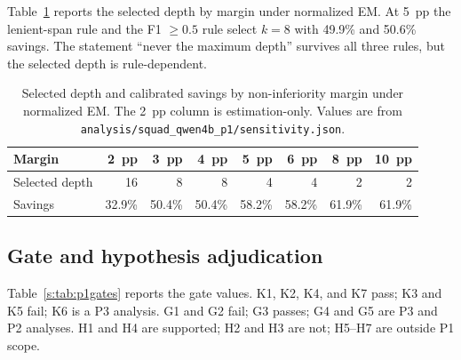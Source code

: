 Table~\ref{tab:p1margin} reports the selected depth by margin under normalized EM. At 5~pp the
lenient-span rule and the F1 $\ge0.5$ rule select $k=8$ with 49.9\% and 50.6\% savings. The
statement ``never the maximum depth'' survives all three rules, but the selected depth is
rule-dependent.

\begin{table}[pos=htbp]
  \centering
  \caption{Selected depth and calibrated savings by non-inferiority margin under normalized EM.
  The 2~pp column is estimation-only. Values are from
  \texttt{analysis/squad\_qwen4b\_p1/sensitivity.json}.}
  \label{tab:p1margin}
  \small
  \setlength{\tabcolsep}{5pt}
  \begin{tabular}{lrrrrrrr}
    \toprule
    \textbf{Margin} & \textbf{2~pp} & \textbf{3~pp} & \textbf{4~pp} & \textbf{5~pp} & \textbf{6~pp} & \textbf{8~pp} & \textbf{10~pp} \\
    \midrule
    Selected depth & 16 & 8 & 8 & 4 & 4 & 2 & 2 \\
    Savings & 32.9\% & 50.4\% & 50.4\% & 58.2\% & 58.2\% & 61.9\% & 61.9\% \\
    \bottomrule
  \end{tabular}
\end{table}

\subsection{Gate and hypothesis adjudication}

Table~\ref{s:tab:p1gates} reports the gate values. K1, K2, K4, and K7 pass; K3 and K5 fail; K6 is
a P3 analysis. G1 and G2 fail; G3 passes; G4 and G5 are P3 and P2 analyses. H1 and H4 are
supported; H2 and H3 are not; H5--H7 are outside P1 scope.

